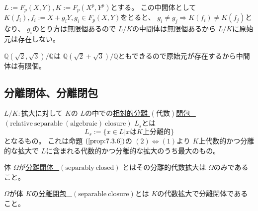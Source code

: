 \documentclass[../master_galois_theory]{subfiles}
\begin{document}
\begin{exam}
  $L := F_p(X,Y) , K := F_p(X^p , Y^p)$とする。
  この中間体として $K(f_i) , f_i := X + g_i Y , g_i \in F_p(X,Y)$をとると、
  $g_i \neq g_j \Rightarrow K(f_i) \neq K(f_j)$となり、
  $g_i$のとり方は無限個あるので $L/K$の中間体は無限個あるから
  $L/K$に原始元は存在しない。
\end{exam}

\begin{exam}
  $\mathbb{Q}(\sqrt{2} , \sqrt{3})/\mathbb{Q}$は
  $\mathbb{Q}(\sqrt{2} + \sqrt{3})/\mathbb{Q}$ともできるので原始元が存在するから中間体は有限個。
\end{exam}

\subsection{分離閉体、分離閉包}

\begin{defi}
  $L/K:$拡大に対して $K$の $L$の中での\underline{相対的分離 $(代数)$閉包 \  $(\mathrm{relative \  separable \  (algebraic) \  closure})$} $L_s$とは
  \[
  L_s := \{ x \in L | xは K上分離的 \}
  \]
  となるもの。
  これは命題 $(\mathrm{\ref{prop:7.3.6}})$の $(2) \Leftrightarrow (1)$より $K$上代数的かつ分離的な拡大で
  $L$に含まれる代数的かつ分離的な拡大のうち最大のもの。
\end{defi}

\begin{defi}
  体 $\Omega$が\underline{分離閉体 \  $(\mathrm{separably \  closed})$}
  とはその分離的代数拡大は $\Omega$のみであること。
\end{defi}

\begin{defi}
  $\Omega$が体 $K$の\underline{分離閉包 \  $(\mathrm{separable \  closure})$}とは
  $K$の代数拡大で分離閉体であること。
\end{defi}
\end{document}

